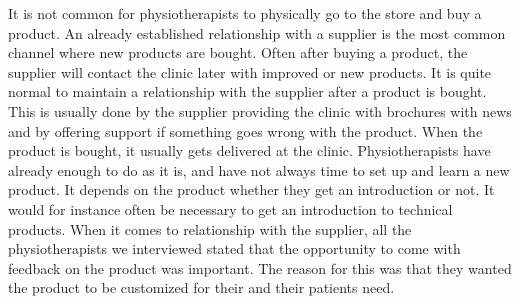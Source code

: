 It is not common for physiotherapists to physically go to the store and buy a product. An already established relationship with a supplier is the most common channel where new products are bought. Often after buying a product, the supplier will contact the clinic later with improved or new products. It is quite normal to maintain a relationship with the supplier after a product is bought. This is usually done by the supplier providing the clinic with brochures with news and by offering support if something goes wrong with the product. When the product is bought, it usually gets delivered at the clinic. Physiotherapists have already enough to do as it is, and have not always time to set up and learn a new product. It depends on the product whether they get an introduction or not. It would for instance often be necessary to get an introduction to technical products. When it comes to relationship with the supplier, all the physiotherapists we interviewed stated that the opportunity to come with feedback on the product was important. The reason for this was that they wanted the product to be customized for their and their patients need. \\ \\
